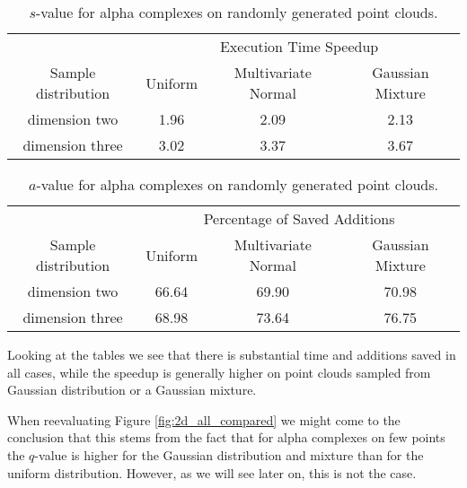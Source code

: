  \begin{table}[H]
     \begin{center}
     \begin{tabular}{|c|c|c|c|}
     \hline
     & \multicolumn{3}{|c|}{Execution Time Speedup} \\ \cline{1-4}
     Sample distribution & Uniform & Multivariate Normal & Gaussian 		Mixture\\ \hline
     dimension two & 1.96 & 2.09 & 2.13\\ \hline
     dimension three & 3.02 & 3.37 & 3.67\\ \hline

     \end{tabular}
     
     \caption{$s$-value for alpha complexes on randomly generated point clouds.}
     \label{tab:time_STA_TWI}
     \end{center}
 \end{table}




 \begin{table}[H]
     \begin{center}
     \begin{tabular}{|c|c|c|c|}
     \hline
     & \multicolumn{3}{|c|}{Percentage of Saved Additions} \\ \cline{1-4}
     Sample distribution & Uniform & Multivariate Normal & Gaussian 		Mixture\\ \hline
     dimension two & 66.64 & 69.90 & 70.98 \\ \hline
     dimension three & 68.98 & 73.64 & 76.75 \\ \hline

     \end{tabular}
     
     \caption{$a$-value for alpha complexes on randomly generated point clouds.}
     \label{tab:add_STA_TWI}
     \end{center}
 \end{table}

Looking at the tables we see that there is substantial time and additions saved in all cases, while the speedup is generally higher on point clouds sampled from Gaussian distribution or a Gaussian mixture. 

When reevaluating Figure \ref{fig:2d_all_compared} we might come to the conclusion that this stems from the fact that for alpha complexes on few points the $q$-value is higher for the Gaussian distribution and mixture than for the uniform distribution. However, as we will see later on, this is not the case.


